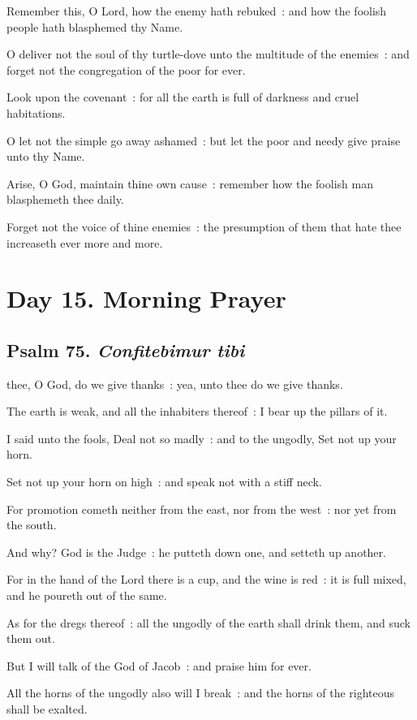 Remember this, O Lord, how the enemy hath rebuked~: and how the foolish people hath blasphemed thy Name.\par
{}O deliver not the soul of thy turtle-dove unto the multitude of the enemies~: and forget not the congregation of the poor for ever.\par
{}Look upon the covenant~: for all the earth is full of darkness and cruel habitations.\par
{}O let not the simple go away ashamed~: but let the poor and needy give praise unto thy Name.\par
{}Arise, O God, maintain thine own cause~: remember how the foolish man blasphemeth thee daily.\par
{}Forget not the voice of thine enemies~: the presumption of them that hate thee increaseth ever more and more.\par

\section*{Day 15. Morning Prayer}

\subsection{Psalm 75. \textit{Confitebimur tibi}}


 thee, O God, do we give thanks~: yea, unto thee do we give thanks.\par
{}
The earth is weak, and all the inhabiters thereof~: I bear up the pillars of it.\par
{}I said unto the fools, Deal not so madly~: and to the ungodly, Set not up your horn.\par
{}Set not up your horn on high~: and speak not with a stiff neck.\par
{}For promotion cometh neither from the east, nor from the west~: nor yet from the south.\par
{}And why? God is the Judge~: he putteth down one, and setteth up another.\par
{}For in the hand of the Lord there is a cup, and the wine is red~: it is full mixed, and he poureth out of the same.\par
{}As for the dregs thereof~: all the ungodly of the earth shall drink them, and suck them out.\par
{}But I will talk of the God of Jacob~: and praise him for ever.\par
{}All the horns of the ungodly also will I break~: and the horns of the righteous shall be exalted.\par

